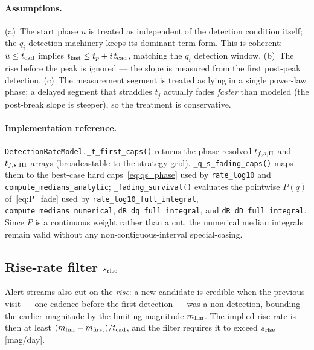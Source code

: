 \documentclass[11pt,a4paper]{article}
\begin{document}
\paragraph{Assumptions.} (a)~The start phase $u$ is treated as independent of the detection condition itself; the $q_i$ detection machinery keeps its dominant-term form. This is coherent: $u\le t_{\rm cad}$ implies $t_{\rm last}\le t_p+i\,t_{\rm cad}$, matching the $q_i$ detection window. (b)~The rise before the peak is ignored --- the slope is measured from the first post-peak detection. (c)~The measurement segment is treated as lying in a single power-law phase; a delayed segment that straddles $t_j$ actually fades \emph{faster} than modeled (the post-break slope is steeper), so the treatment is conservative.

\paragraph{Implementation reference.} \texttt{DetectionRateModel.\_t\_first\_caps()} returns the phase-resolved $t_{f,s,\rm II}$ and $t_{f,s,\rm III}$ arrays (broadcastable to the strategy grid). \texttt{\_q\_s\_fading\_caps()} maps them to the best-case hard caps~\eqref{eq:qs_phase} used by \texttt{rate\_log10} and \texttt{compute\_medians\_analytic}; \texttt{\_fading\_survival()} evaluates the pointwise $P(q)$ of~\eqref{eq:P_fade} used by \texttt{rate\_log10\_full\_integral}, \texttt{compute\_medians\_numerical}, \texttt{dR\_dq\_full\_integral}, and \texttt{dR\_dD\_full\_integral}. Since $P$ is a continuous weight rather than a cut, the numerical median integrals remain valid without any non-contiguous-interval special-casing.

\subsection{Rise-rate filter $s_{\rm rise}$}
\label{sec:filter_srise}

Alert streams also cut on the \emph{rise}: a new candidate is credible when the previous visit --- one cadence before the first detection --- was a non-detection, bounding the earlier magnitude by the limiting magnitude $m_{\rm lim}$. The implied rise rate is then at least $(m_{\rm lim}-m_{\rm first})/t_{\rm cad}$, and the filter requires it to exceed $s_{\rm rise}$ [mag/day].
\end{document}
